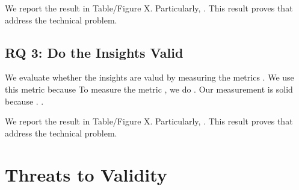 We report the result in Table/Figure X. Particularly, \blank{}. This result proves that \toolname address the technical problem.

\subsection{RQ 3: Do the Insights Valid}
We evaluate whether the insights are valud by measuring the metrics \blank{}. We use this metric because   To measure the metric  \blank{}, we do \blank{}. Our measurement is solid because \blank{}. .

We report the result in Table/Figure X. Particularly, \blank{}. This result proves that \toolname address the technical problem.

\section{Threats to Validity}

